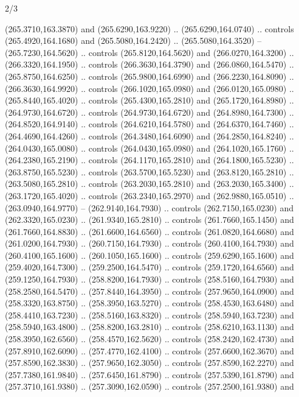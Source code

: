 \begin{flagdescription}{2/3}
\begin{scope}[xshift=0.5\flaglength,yshift=0.5\flagwidth,scale=\flagwidth/259.2]
\begin{scope}[y=0.8pt, x=0.8pt, yscale=-1,shift={(-243,-162)}]
      (265.3710,163.3870) and (265.6290,163.9220) .. (265.6290,164.0740) .. controls
      (265.4920,164.1680) and (265.5080,164.2420) .. (265.5080,164.3520) --
      (265.7230,164.5620) .. controls (265.8120,164.5620) and (266.0270,164.3200) ..
      (266.3320,164.1950) .. controls (266.3630,164.3790) and (266.0860,164.5470) ..
      (265.8750,164.6250) .. controls (265.9800,164.6990) and (266.2230,164.8090) ..
      (266.3630,164.9920) .. controls (266.1020,165.0980) and (266.0120,165.0980) ..
      (265.8440,165.4020) .. controls (265.4300,165.2810) and (265.1720,164.8980) ..
      (264.9730,164.6720) .. controls (264.9730,164.6720) and (264.8980,164.7300) ..
      (264.8520,164.9140) .. controls (264.6210,164.5780) and (264.6370,164.7460) ..
      (264.4690,164.4260) .. controls (264.3480,164.6090) and (264.2850,164.8240) ..
      (264.0430,165.0080) .. controls (264.0430,165.0980) and (264.1020,165.1760) ..
      (264.2380,165.2190) .. controls (264.1170,165.2810) and (264.1800,165.5230) ..
      (263.8750,165.5230) .. controls (263.5700,165.5230) and (263.8120,165.2810) ..
      (263.5080,165.2810) .. controls (263.2030,165.2810) and (263.2030,165.3400) ..
      (263.1720,165.4020) .. controls (263.2340,165.2970) and (262.9880,165.0510) ..
      (263.0940,164.9770) -- (262.9140,164.7930) .. controls (262.7150,165.0230) and
      (262.3320,165.0230) .. (261.9340,165.2810) .. controls (261.7660,165.1450) and
      (261.7660,164.8830) .. (261.6600,164.6560) .. controls (261.0820,164.6680) and
      (261.0200,164.7930) .. (260.7150,164.7930) .. controls (260.4100,164.7930) and
      (260.4100,165.1600) .. (260.1050,165.1600) .. controls (259.6290,165.1600) and
      (259.4020,164.7300) .. (259.2500,164.5470) .. controls (259.1720,164.6560) and
      (259.1250,164.7930) .. (258.8200,164.7930) .. controls (258.5160,164.7930) and
      (258.2580,164.5470) .. (257.8440,164.3950) .. controls (257.9650,164.0900) and
      (258.3320,163.8750) .. (258.3950,163.5270) .. controls (258.4530,163.6480) and
      (258.4410,163.7230) .. (258.5160,163.8320) .. controls (258.5940,163.7230) and
      (258.5940,163.4800) .. (258.8200,163.2810) .. controls (258.6210,163.1130) and
      (258.3950,162.6560) .. (258.4570,162.5620) .. controls (258.2420,162.4730) and
      (257.8910,162.6090) .. (257.4770,162.4100) .. controls (257.6600,162.3670) and
      (257.8590,162.3830) .. (257.9650,162.3050) .. controls (257.8590,162.2270) and
      (257.7380,161.9840) .. (257.6450,161.8790) .. controls (257.5390,161.8790) and
      (257.3710,161.9380) .. (257.3090,162.0590) .. controls (257.2500,161.9380) and

\end{scope}
\end{scope}
\end{flagdescription}
